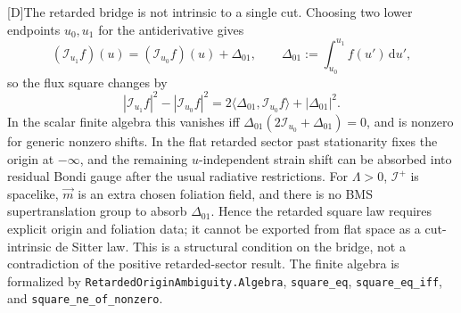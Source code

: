 \documentclass[11pt,a4paper]{article}
\newcommand{\scri}{\mathscr{I}}
\newcommand{\diff}{\mathrm{d}}
\newcommand{\statusD}{\textsf{[D]}}
\begin{document}
\statusD The retarded bridge is not intrinsic to a single cut.  Choosing two lower endpoints \(u_0,u_1\) for the antiderivative gives
\[
  (\mathcal I_{u_1}f)(u)
  =
  (\mathcal I_{u_0}f)(u)+\Delta_{01},
  \qquad
  \Delta_{01}:=\int_{u_0}^{u_1}f(u')\,\diff u' ,
\]
so the flux square changes by
\[
  |\mathcal I_{u_1}f|^2-|\mathcal I_{u_0}f|^2
  =
  2\langle\Delta_{01},\mathcal I_{u_0}f\rangle+|\Delta_{01}|^2 .
\]
In the scalar finite algebra this vanishes iff \(\Delta_{01}(2\mathcal I_{u_0}+\Delta_{01})=0\), and is nonzero for generic nonzero shifts.  In the flat retarded sector past stationarity fixes the origin at \(-\infty\), and the remaining \(u\)-independent strain shift can be absorbed into residual Bondi gauge after the usual radiative restrictions.  For \(\Lambda>0\), \(\scri^+\) is spacelike, \(\vec m\) is an extra chosen foliation field, and there is no BMS supertranslation group to absorb \(\Delta_{01}\).  Hence the retarded square law requires explicit origin and foliation data; it cannot be exported from flat space as a cut-intrinsic de Sitter law.  This is a structural condition on the bridge, not a contradiction of the positive retarded-sector result.  The finite algebra is formalized by \texttt{RetardedOriginAmbiguity.Algebra}, \texttt{square\_eq}, \texttt{square\_eq\_iff}, and \texttt{square\_ne\_of\_nonzero}.
\end{document}
